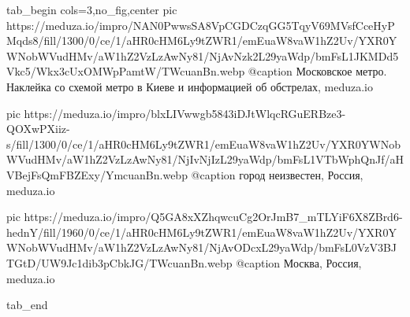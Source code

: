 \ifcmt
  tab_begin cols=3,no_fig,center
		pic https://meduza.io/impro/NAN0PwwsSA8VpCGDCzqGG5TqyV69MVsfCceHyPMqds8/fill/1300/0/ce/1/aHR0cHM6Ly9tZWR1/emEuaW8vaW1hZ2Uv/YXR0YWNobWVudHMv/aW1hZ2VzLzAwNy81/NjAvNzk2L29yaWdp/bmFsL1JKMDd5Vkc5/Wkx3cUxOMWpPamtW/TWcuanBn.webp
		@caption Московское метро. Наклейка со схемой метро в Киеве и информацией об обстрелах, meduza.io

		pic https://meduza.io/impro/blxLIVwwgb5843iDJtWlqcRGuERBze3-QOXwPXiiz-s/fill/1300/0/ce/1/aHR0cHM6Ly9tZWR1/emEuaW8vaW1hZ2Uv/YXR0YWNobWVudHMv/aW1hZ2VzLzAwNy81/NjIvNjIzL29yaWdp/bmFsL1VTbWphQnJf/aHVBejFsQmFBZExy/YmcuanBn.webp
		@caption город неизвестен, Россия, meduza.io

		pic https://meduza.io/impro/Q5GA8xXZhqwcuCg2OrJmB7_mTLYiF6X8ZBrd6-hednY/fill/1960/0/ce/1/aHR0cHM6Ly9tZWR1/emEuaW8vaW1hZ2Uv/YXR0YWNobWVudHMv/aW1hZ2VzLzAwNy81/NjAvODcxL29yaWdp/bmFsL0VzV3BJTGtD/UW9Jc1dib3pCbkJG/TWcuanBn.webp
		@caption Москва, Россия, meduza.io

  tab_end
\fi

